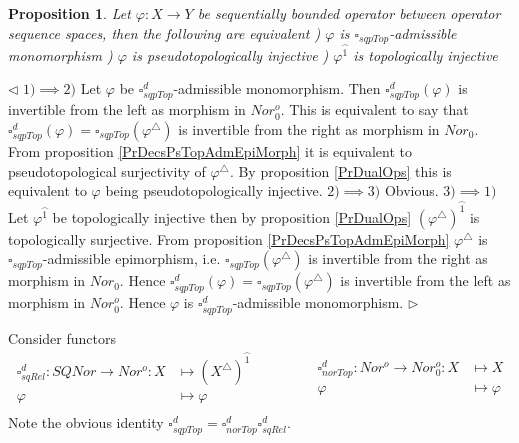 \documentclass[12pt]{article}
\newtheorem{proposition}[theorem]{Proposition}
\newenvironment{proof}{\par $\triangleleft$}{$\triangleright$}
\begin{document}
\begin{proposition}\label{PrDecsPsTopAdmMonoMorph}
Let $\varphi:X\to Y$ be sequentially bounded operator between operator sequence spaces, then the following are equivalent
) $\varphi$ is $\square_{sqpTop}$-admissible monomorphism
) $\varphi$ is pseudotopologically injective
) $\varphi^{\wideparen{1}}$ is topologically injective
\end{proposition}
\begin{proof}
$1)\implies 2)$ Let $\varphi$ be $\square_{sqpTop}^d$-admissible monomorphism. Then $\square_{sqpTop}^d(\varphi)$ is invertible from the left as morphism in $Nor_0^o$. This is equivalent to say that
$\square_{sqpTop}^d(\varphi)=\square_{sqpTop}(\varphi^\triangle)$ is invertible from the right as morphism in $Nor_0$. From proposition \ref{PrDecsPsTopAdmEpiMorph} it is equivalent to pseudotopological surjectivity of $\varphi^\triangle$. 
By proposition \ref{PrDualOps} this is equivalent to $\varphi$ being pseudotopologically injective.
\newline
$2)\implies 3)$ Obvious.
\newline
$3)\implies 1)$ Let $\varphi^{\wideparen{1}}$ be topologically injective then by proposition \ref{PrDualOps} $(\varphi^\triangle)^{\wideparen{1}}$ is topologically surjective. From proposition \ref{PrDecsPsTopAdmEpiMorph} $\varphi^\triangle$ is $\square_{sqpTop}$-admissible epimorphism, i.e. $\square_{sqpTop}(\varphi^\triangle)$ is invertible from the right as morphism in $Nor_0$. Hence $\square_{sqpTop}^d(\varphi)=\square_{sqpTop}(\varphi^\triangle)$ is invertible from the left as morphism in $Nor_0^o$. Hence $\varphi$  is $\square_{sqpTop}^d$-admissible monomorphism. 
\end{proof}

Consider functors
$$
\begin{aligned}
\square_{sqRel}^d : SQNor \to Nor^o: X &\mapsto (X^\triangle)^{\wideparen{1}}\\
\varphi&\mapsto\varphi\\
\end{aligned}
\qquad\qquad
\begin{aligned}
\square_{norTop}^d : Nor^o \to Nor_0^o: X &\mapsto X\\
\varphi&\mapsto\varphi\\
\end{aligned}
$$
Note the obvious identity $\square_{sqpTop}^d=\square_{norTop}^d\square_{sqRel}^d$.
\end{document}
